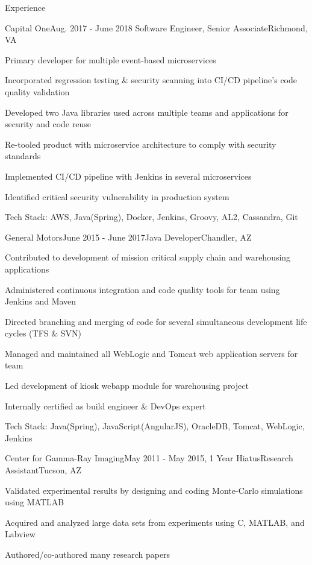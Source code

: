 \documentclass{resume} %
\begin{document}
\begin{rSection}{\vspace{-1em}Experience}
	\begin{rSubsection}{Capital One}{Aug. 2017 - June 2018}
			{Software Engineer, Senior Associate}{Richmond, VA}
		\item Primary developer for multiple event-based microservices
		\item Incorporated regression testing \& security scanning into CI/CD pipeline's code quality validation
		\item Developed two Java libraries used across multiple teams and applications for security and code reuse
		\item Re-tooled product with microservice architecture to comply with security standards
		\item Implemented CI/CD pipeline with Jenkins in several microservices
		\item Identified critical security vulnerability in production system
		\item Tech Stack: AWS, Java(Spring), Docker, Jenkins, Groovy, AL2, Cassandra, Git
	\end{rSubsection}\vspace{-0.5em}

	\begin{rSubsection}{General Motors}{June 2015 - June 2017}{Java Developer}{Chandler, AZ}
		\item Contributed to development of mission critical supply chain and warehousing applications
		\item Administered continuous integration and code quality tools for team using Jenkins and Maven
		\item Directed branching and merging of code for several simultaneous development life cycles (TFS \& SVN)
		\item Managed and maintained all WebLogic and Tomcat web application servers for team
		\item Led development of kiosk webapp module for warehousing project
		\item Internally certified as build engineer \& DevOps expert
		\item Tech Stack: Java(Spring), JavaScript(AngularJS), OracleDB, Tomcat, WebLogic, Jenkins
	\end{rSubsection}\vspace{-0.5em}


	\begin{rSubsection}{Center for Gamma-Ray Imaging}{May 2011 - May 2015, 1 Year Hiatus}{Research Assistant}{Tucson, AZ}
		\item Validated experimental results by designing and coding Monte-Carlo simulations using MATLAB
		\item Acquired and analyzed large data sets from experiments using C, MATLAB, and Labview
		\item Authored/co-authored many research papers

	\end{rSubsection}

\end{rSection}
\end{document}
